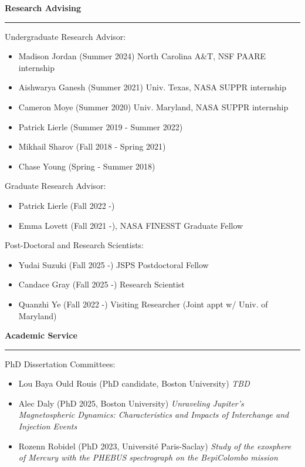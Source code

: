 \documentclass[12pt]{report}
\begin{document}
\vspace{2 mm}
\noindent \bf{Research Advising}\rm \hspace*{\fill} \\
\rule{\textwidth}{1pt}

\noindent Undergraduate Research Advisor: 
\begin{itemize} \itemsep -2pt 
	\item Madison Jordan (Summer 2024) North Carolina A\&T, NSF PAARE internship
	\item Aishwarya Ganesh (Summer 2021) Univ. Texas, NASA SUPPR internship
	\item Cameron Moye (Summer 2020) Univ. Maryland, NASA SUPPR internship
	\item Patrick Lierle (Summer 2019 - Summer 2022)
	\item Mikhail Sharov (Fall 2018 - Spring 2021)
	\item Chase Young (Spring - Summer 2018)
\end{itemize}
\noindent Graduate Research Advisor: 
\begin{itemize} \itemsep -2pt
	\item Patrick Lierle (Fall 2022 -) 
	\item Emma Lovett (Fall 2021 -), NASA FINESST Graduate Fellow
\end{itemize}

\noindent Post-Doctoral and Research Scientists: 
\begin{itemize} \itemsep -2pt
	\item Yudai Suzuki (Fall 2025 -) JSPS Postdoctoral Fellow
	\item Candace Gray (Fall 2025 -) Research Scientist
	\item Quanzhi Ye (Fall 2022 -) Visiting Researcher (Joint appt w/ Univ. of Maryland)
\end{itemize}

\vspace{2 mm}
\noindent \bf{Academic Service}\rm \hspace*{\fill} \\
\rule{\textwidth}{1pt}

\noindent PhD Dissertation Committees:
\begin{itemize} \itemsep -2pt
	\item Lou Baya Ould Rouis (PhD candidate, Boston University) \textit{TBD}
	\item Alec Daly (PhD 2025, Boston University) \textit{Unraveling Jupiter's Magnetospheric Dynamics: Characteristics and Impacts of Interchange and Injection Events}
	\item Rozenn Robidel (PhD 2023, Université Paris-Saclay) \textit{Study of the exosphere of Mercury with the PHEBUS spectrograph on the BepiColombo mission}
\end{itemize}
\end{document}
